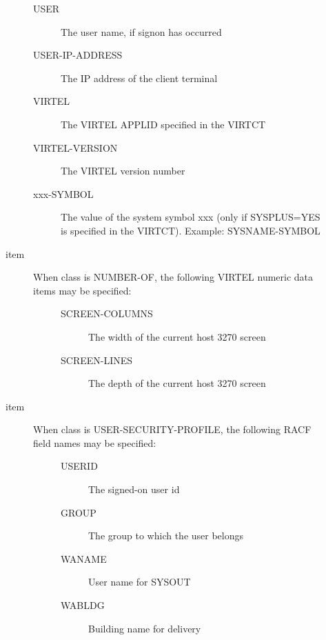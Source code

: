 \documentclass[letterpaper,10pt,english]{sphinxmanual}
\begin{document}
\begin{description}
\begin{description}
\begin{description}
\item[{USER}] \leavevmode
The user name, if signon has occurred

\item[{USER-IP-ADDRESS}] \leavevmode
The IP address of the client terminal

\item[{VIRTEL}] \leavevmode
The VIRTEL APPLID specified in the VIRTCT

\item[{VIRTEL-VERSION}] \leavevmode
The VIRTEL version number

\item[{xxx-SYMBOL}] \leavevmode
The value of the system symbol xxx (only if SYSPLUS=YES is specified in the VIRTCT). Example: SYSNAME-SYMBOL

\end{description}

\item[{item}] \leavevmode\begin{description}
\item[{When class is NUMBER-OF, the following VIRTEL numeric data items may be specified:}] \leavevmode\begin{description}
\item[{SCREEN-COLUMNS}] \leavevmode
The width of the current host 3270 screen

\item[{SCREEN-LINES}] \leavevmode
The depth of the current host 3270 screen

\end{description}

\end{description}

\item[{item}] \leavevmode\begin{description}
\item[{When class is USER-SECURITY-PROFILE, the following RACF field names may be specified:}] \leavevmode\begin{description}
\item[{USERID}] \leavevmode
The signed-on user id

\item[{GROUP}] \leavevmode
The group to which the user belongs

\item[{WANAME}] \leavevmode
User name for SYSOUT

\item[{WABLDG}] \leavevmode
Building name for delivery


\end{description}
\end{description}
\end{description}
\end{description}
\end{document}
